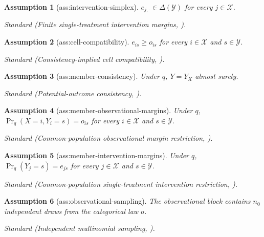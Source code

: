 \documentclass{article}
\newtheorem{assumption}{Assumption}
\begin{document}
\begin{assumption}[ass:intervention-simplex]\label{ass:intervention-simplex}
\(e_{j,\cdot}\in\Delta(\mathcal Y)\) for every \(j\in\mathcal X\).
\par\smallskip\noindent\emph{Standard} (Finite single-treatment intervention margins, \cite{ShuWangLi2026ClosedForm}).
\end{assumption}

\begin{assumption}[ass:cell-compatibility]\label{ass:cell-compatibility}
\(e_{is}\geq o_{is}\) for every \(i\in\mathcal X\) and \(s\in\mathcal Y\).
\par\smallskip\noindent\emph{Standard} (Consistency-implied cell compatibility, \cite{ShuWangLi2026ClosedForm}).
\end{assumption}

\begin{assumption}[ass:member-consistency]\label{ass:member-consistency}
Under \(q\), \(Y=Y_X\) almost surely.
\par\smallskip\noindent\emph{Standard} (Potential-outcome consistency, \cite{Pearl2009Causality}).
\end{assumption}

\begin{assumption}[ass:member-observational-margins]\label{ass:member-observational-margins}
Under \(q\), \(\Pr_q(X=i,Y_i=s)=o_{is}\) for every \(i\in\mathcal X\) and \(s\in\mathcal Y\).
\par\smallskip\noindent\emph{Standard} (Common-population observational margin restriction, \cite{ShuWangLi2026ClosedForm}).
\end{assumption}

\begin{assumption}[ass:member-intervention-margins]\label{ass:member-intervention-margins}
Under \(q\), \(\Pr_q(Y_j=s)=e_{js}\) for every \(j\in\mathcal X\) and \(s\in\mathcal Y\).
\par\smallskip\noindent\emph{Standard} (Common-population single-treatment intervention restriction, \cite{ShuWangLi2026ClosedForm}).
\end{assumption}

\begin{assumption}[ass:observational-sampling]\label{ass:observational-sampling}
The observational block contains \(n_0\) independent draws from the categorical law \(o\).
\par\smallskip\noindent\emph{Standard} (Independent multinomial sampling, \cite{ChengMaoPearlLi2026DeltaPoC}).
\end{assumption}
\end{document}
